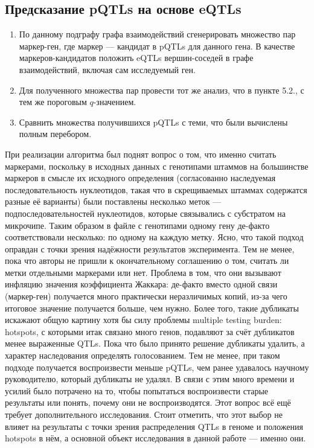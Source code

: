 \documentclass[11pt,a4paper]{report}
\theoremstyle{definition}
\theoremstyle{definition}
\theoremstyle{definition}
\begin{document}
	\subsection{Предсказание pQTLs на основе eQTLs}
	\begin{enumerate}
		\item По данному подграфу графа взаимодействий сгенерировать множество пар маркер-ген, где маркер — кандидат в pQTLs для данного гена. В качестве маркеров-кандидатов положить eQTLs вершин-соседей в графе взаимодействий, включая сам исследуемый ген. 
		\item Для полученного множества пар провести тот же анализ, что в пункте 5.2., с тем же пороговым $ q $-значением. 
		\item Сравнить множества получившихся pQTLs с теми, что были вычислены полным перебором.
	\end{enumerate}
	При реализации алгоритма был поднят вопрос о том, что именно считать маркерами, поскольку в исходных данных с генотипами штаммов на большинстве маркеров в смысле их исходного определения (согласованно наследуемая последовательность нуклеотидов, такая что в скрещиваемых штаммах содержатся разные её варианты) были поставлены несколько меток — подпоследовательностей нуклеотидов, которые связывались с субстратом на микрочипе. Таким образом в файле с генотипами одному гену де-факто соответствовали несколько: по одному на каждую метку. Ясно, что такой подход оправдан с точки зрения надёжности результатов эксперимента. Тем не менее, пока что авторы не пришли к окончательному соглашению о том, считать ли метки отдельными маркерами или нет. Проблема в том, что они вызывают инфляцию значения коэффициента Жаккара: де-факто вместо одной связи (маркер-ген) получается много практически неразличимых копий, из-за чего итоговое значение получается больше, чем нужно. Более того, такие дубликаты искажают общую картину хотя бы силу проблемы multiple testing burden: hotspots, с которыми итак связано много генов, подавляют за счёт дубликатов менее выраженные QTLs. Пока что было принято решение дубликаты удалить, а характер наследования определять голосованием. Тем не менее, при таком подходе получается воспроизвести меньше pQTLs, чем ранее удавалось научному руководителю, который дубликаты не удалял. В связи с этим много времени и усилий было потрачено на то, чтобы попытаться воспроизвести старые результаты или понять, почему они не воспроизводятся. Этот вопрос всё ещё требует дополнительного исследования. Стоит отметить, что этот выбор не влияет на результаты с точки зрения распределения QTLs в геноме и положения hotspots в нём, а основной объект исследования в данной работе — именно они.
\end{document}
